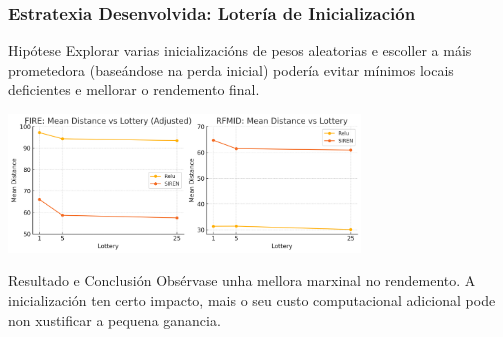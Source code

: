 \documentclass[xcolor=dvipsnames]{beamer}
\begin{document}
\begin{frame}
    \frametitle{Estratexia Desenvolvida: Lotería de Inicialización}
    
    \begin{block}{Hipótese}
        Explorar varias inicializacións de pesos aleatorias e escoller a máis prometedora (baseándose na perda inicial) podería evitar mínimos locais deficientes e mellorar o rendemento final.
    \end{block}
    
    \centering
    \includegraphics[width=0.7\textwidth]{../imaxes/lottery/lotery.png}
    
    \begin{alertblock}{Resultado e Conclusión}
        Obsérvase unha mellora marxinal no rendemento. A inicialización ten certo impacto, mais o seu custo computacional adicional pode non xustificar a pequena ganancia.
    \end{alertblock}

\end{frame}
\end{document}

